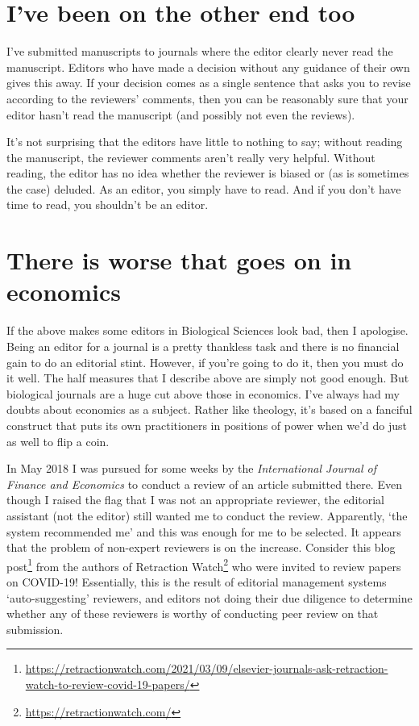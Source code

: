 \documentclass[
]{krantz}
\renewcommand{\href}[2]{#2\footnote{\url{#1}}}
\begin{document}
\hypertarget{ive-been-on-the-other-end-too}{%
\section{I've been on the other end too}\label{ive-been-on-the-other-end-too}}

I've submitted manuscripts to journals where the editor clearly never read the manuscript. Editors who have made a decision without any guidance of their own gives this away. If your decision comes as a single sentence that asks you to revise according to the reviewers' comments, then you can be reasonably sure that your editor hasn't read the manuscript (and possibly not even the reviews).

It's not surprising that the editors have little to nothing to say; without reading the manuscript, the reviewer comments aren't really very helpful. Without reading, the editor has no idea whether the reviewer is biased or (as is sometimes the case) deluded. As an editor, you simply have to read. And if you don't have time to read, you shouldn't be an editor.

\hypertarget{there-is-worse-that-goes-on-in-economics}{%
\section{There is worse that goes on in economics}\label{there-is-worse-that-goes-on-in-economics}}

If the above makes some editors in Biological Sciences look bad, then I apologise. Being an editor for a journal is a pretty thankless task and there is no financial gain to do an editorial stint. However, if you're going to do it, then you must do it well. The half measures that I describe above are simply not good enough. But biological journals are a huge cut above those in economics. I've always had my doubts about economics as a subject. Rather like theology, it's based on a fanciful construct that puts its own practitioners in positions of power when we'd do just as well to flip a coin.

In May 2018 I was pursued for some weeks by the \emph{International Journal of Finance and Economics} to conduct a review of an article submitted there. Even though I raised the flag that I was not an appropriate reviewer, the editorial assistant (not the editor) still wanted me to conduct the review. Apparently, `the system recommended me' and this was enough for me to be selected. It appears that the problem of non-expert reviewers is on the increase. Consider this \href{https://retractionwatch.com/2021/03/09/elsevier-journals-ask-retraction-watch-to-review-covid-19-papers/}{blog post} from the authors of \href{https://retractionwatch.com/}{Retraction Watch} who were invited to review papers on COVID-19! Essentially, this is the result of editorial management systems `auto-suggesting' reviewers, and editors not doing their due diligence to determine whether any of these reviewers is worthy of conducting peer review on that submission.
\end{document}
